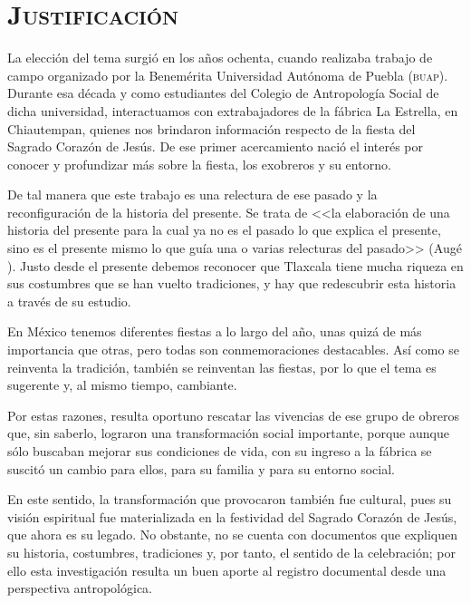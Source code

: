 \documentclass[14pt,letterpaper,twoside]{extbook} %
\begin{document}
\section*{\mdseries\large\textsc{Justificación}}

\noindent La elección del tema surgió en los años ochenta, cuando realizaba trabajo de campo organizado por la Benemérita Universidad Autónoma de Puebla (\textsc{buap}). Durante esa década y como estudiantes del Colegio de Antropología Social de dicha universidad, interactuamos con extrabajadores de la fábrica La Estrella, en Chiautempan, quienes nos brindaron información respecto de la fiesta del Sagrado Corazón de Jesús. De ese primer acercamiento nació el interés por conocer y profundizar más sobre la fiesta, los exobreros y su entorno.

De tal manera que este trabajo es una relectura de ese pasado y la reconfiguración de la historia del presente. Se trata de <<la elaboración de una historia del presente para la cual ya no es el pasado lo que explica el presente, sino es el presente mismo lo que guía una o varias relecturas del pasado>> (Augé ). Justo desde el presente debemos reconocer que Tlaxcala tiene mucha riqueza en sus costumbres que se han vuelto tradiciones, y hay que redescubrir esta historia a través de su estudio.

En México tenemos diferentes fiestas a lo largo del año, unas quizá de más importancia que otras, pero todas son conmemoraciones destacables. Así como se reinventa la tradición, también se reinventan las fiestas, por lo que el tema es sugerente y, al mismo tiempo, cambiante.

Por estas razones, resulta oportuno rescatar las vivencias de ese grupo de obreros que, sin saberlo, lograron una transformación social importante, porque aunque sólo buscaban mejorar sus condiciones de vida, con su ingreso a la fábrica se suscitó un cambio para ellos, para su familia y para su entorno social.

En este sentido, la transformación que provocaron también fue cultural, pues su visión espiritual fue materializada en la festividad del Sagrado Corazón de Jesús, que ahora es su legado. No obstante, no se cuenta con documentos que expliquen su historia, costumbres, tradiciones y, por tanto, el sentido de la celebración; por ello esta investigación resulta un buen aporte al registro documental desde una perspectiva antropológica.
\end{document}
